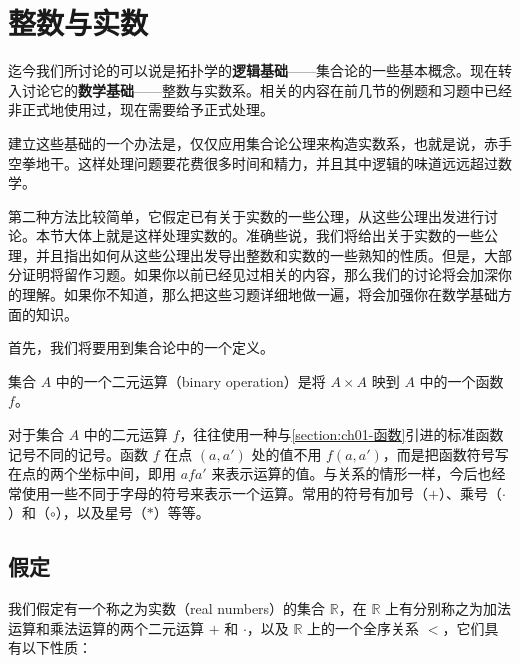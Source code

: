 \documentclass[../../main.tex]{subfiles}
\begin{document}
\section{整数与实数}\label{section:ch01-整数与实数}

迄今我们所讨论的可以说是拓扑学的\textbf{逻辑基础}——集合论的一些基本概念。现在转入讨论它的\textbf{数学基础}——整数与实数系。相关的内容在前几节的例题和习题中已经非正式地使用过，现在需要给予正式处理。

建立这些基础的一个办法是，仅仅应用集合论公理来构造实数系，也就是说，赤手空拳地干。这样处理问题要花费很多时间和精力，并且其中逻辑的味道远远超过数学。

第二种方法比较简单，它假定已有关于实数的一些公理，从这些公理出发进行讨论。本节大体上就是这样处理实数的。准确些说，我们将给出关于实数的一些公理，并且指出如何从这些公理出发导出整数和实数的一些熟知的性质。但是，大部分证明将留作习题。如果你以前已经见过相关的内容，那么我们的讨论将会加深你的理解。如果你不知道，那么把这些习题详细地做一遍，将会加强你在数学基础方面的知识。

首先，我们将要用到集合论中的一个定义。

\begin{definition}[二元运算]\label{definition:ch01-二元运算}
集合 $A$ 中的一个二元运算（binary operation）是将 $A \times A$ 映到 $A$ 中的一个函数 $f$。
\end{definition}

对于集合 $A$ 中的二元运算 $f$，往往使用一种与\cref{section:ch01-函数}引进的标准函数记号不同的记号。函数 $f$ 在点 $(a, a')$ 处的值不用 $f(a, a')$，而是把函数符号写在点的两个坐标中间，即用 $afa'$ 来表示运算的值。与关系的情形一样，今后也经常使用一些不同于字母的符号来表示一个运算。常用的符号有加号（$+$）、乘号（$\cdot$）和（$\circ$），以及星号（$\ast$）等等。

\subsection*{假定}

我们假定有一个称之为实数（real numbers）的集合 $\mathbb{R}$，在 $\mathbb{R}$ 上有分别称之为加法运算和乘法运算的两个二元运算 $+$ 和 $\cdot$，以及 $\mathbb{R}$ 上的一个全序关系 $<$，它们具有以下性质：
\end{document}
